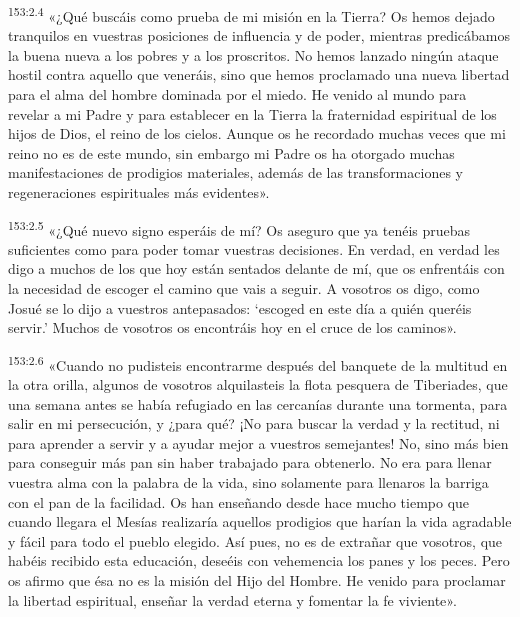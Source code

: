 \par 
\textsuperscript{153:2.4} «¿Qué buscáis como prueba de mi misión en la Tierra? Os hemos dejado tranquilos en vuestras posiciones de influencia y de poder, mientras predicábamos la buena nueva a los pobres y a los proscritos. No hemos lanzado ningún ataque hostil contra aquello que veneráis, sino que hemos proclamado una nueva libertad para el alma del hombre dominada por el miedo. He venido al mundo para revelar a mi Padre y para establecer en la Tierra la fraternidad espiritual de los hijos de Dios, el reino de los cielos. Aunque os he recordado muchas veces que mi reino no es de este mundo, sin embargo mi Padre os ha otorgado muchas manifestaciones de prodigios materiales, además de las transformaciones y regeneraciones espirituales más evidentes».

\par 
\textsuperscript{153:2.5} «¿Qué nuevo signo esperáis de mí? Os aseguro que ya tenéis pruebas suficientes como para poder tomar vuestras decisiones. En verdad, en verdad les digo a muchos de los que hoy están sentados delante de mí, que os enfrentáis con la necesidad de escoger el camino que vais a seguir. A vosotros os digo, como Josué se lo dijo a vuestros antepasados: `escoged en este día a quién queréis servir.' Muchos de vosotros os encontráis hoy en el cruce de los caminos».

\par 
\textsuperscript{153:2.6} «Cuando no pudisteis encontrarme después del banquete de la multitud en la otra orilla, algunos de vosotros alquilasteis la flota pesquera de Tiberiades, que una semana antes se había refugiado en las cercanías durante una tormenta, para salir en mi persecución, y ¿para qué? ¡No para buscar la verdad y la rectitud, ni para aprender a servir y a ayudar mejor a vuestros semejantes! No, sino más bien para conseguir más pan sin haber trabajado para obtenerlo. No era para llenar vuestra alma con la palabra de la vida, sino solamente para llenaros la barriga con el pan de la facilidad. Os han enseñando desde hace mucho tiempo que cuando llegara el Mesías realizaría aquellos prodigios que harían la vida agradable y fácil para todo el pueblo elegido. Así pues, no es de extrañar que vosotros, que habéis recibido esta educación, deseéis con vehemencia los panes y los peces. Pero os afirmo que ésa no es la misión del Hijo del Hombre. He venido para proclamar la libertad espiritual, enseñar la verdad eterna y fomentar la fe viviente».

